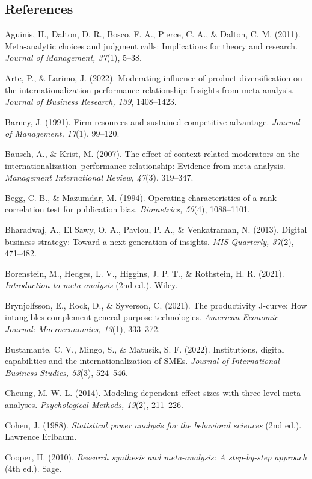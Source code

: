 \documentclass[
  12pt,a4paper]{article}
\begin{document}
\hypertarget{references}{%
\subsection{References}\label{references}}

Aguinis, H., Dalton, D. R., Bosco, F. A., Pierce, C. A., \& Dalton, C.
M. (2011). Meta-analytic choices and judgment calls: Implications for
theory and research. \emph{Journal of Management, 37}(1), 5--38.

Arte, P., \& Larimo, J. (2022). Moderating influence of product
diversification on the internationalization-performance relationship:
Insights from meta-analysis. \emph{Journal of Business Research, 139},
1408--1423.

Barney, J. (1991). Firm resources and sustained competitive advantage.
\emph{Journal of Management, 17}(1), 99--120.

Bausch, A., \& Krist, M. (2007). The effect of context-related
moderators on the internationalization--performance relationship:
Evidence from meta-analysis. \emph{Management International Review,
47}(3), 319--347.

Begg, C. B., \& Mazumdar, M. (1994). Operating characteristics of a rank
correlation test for publication bias. \emph{Biometrics, 50}(4),
1088--1101.

Bharadwaj, A., El Sawy, O. A., Pavlou, P. A., \& Venkatraman, N. (2013).
Digital business strategy: Toward a next generation of insights.
\emph{MIS Quarterly, 37}(2), 471--482.

Borenstein, M., Hedges, L. V., Higgins, J. P. T., \& Rothstein, H. R.
(2021). \emph{Introduction to meta-analysis} (2nd ed.). Wiley.

Brynjolfsson, E., Rock, D., \& Syverson, C. (2021). The productivity
J-curve: How intangibles complement general purpose technologies.
\emph{American Economic Journal: Macroeconomics, 13}(1), 333--372.

Bustamante, C. V., Mingo, S., \& Matusik, S. F. (2022). Institutions,
digital capabilities and the internationalization of SMEs. \emph{Journal
of International Business Studies, 53}(3), 524--546.

Cheung, M. W.-L. (2014). Modeling dependent effect sizes with
three-level meta-analyses. \emph{Psychological Methods, 19}(2),
211--226.

Cohen, J. (1988). \emph{Statistical power analysis for the behavioral
sciences} (2nd ed.). Lawrence Erlbaum.

Cooper, H. (2010). \emph{Research synthesis and meta-analysis: A
step-by-step approach} (4th ed.). Sage.
\end{document}
